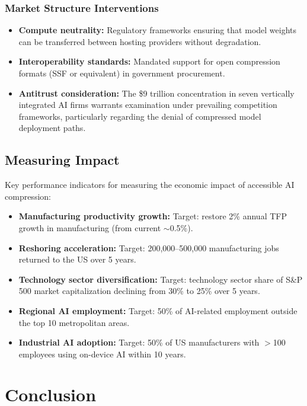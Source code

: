 \documentclass[11pt,a4paper,openright]{book}
\begin{document}
\subsection{Market Structure Interventions}

\begin{itemize}
	\item \textbf{Compute neutrality:} Regulatory frameworks ensuring that model weights can be transferred between hosting providers without degradation.
	\item \textbf{Interoperability standards:} Mandated support for open compression formats (SSF or equivalent) in government procurement.
	\item \textbf{Antitrust consideration:} The \$9 trillion concentration in seven vertically integrated AI firms warrants examination under prevailing competition frameworks, particularly regarding the denial of compressed model deployment paths.
\end{itemize}

\section{Measuring Impact}

Key performance indicators for measuring the economic impact of accessible AI compression:

\begin{itemize}
	\item \textbf{Manufacturing productivity growth:} Target: restore 2\% annual TFP growth in manufacturing (from current $\sim$0.5\%).
	\item \textbf{Reshoring acceleration:} Target: 200,000--500,000 manufacturing jobs returned to the US over 5 years.
	\item \textbf{Technology sector diversification:} Target: technology sector share of S\&P 500 market capitalization declining from 30\% to 25\% over 5 years.
	\item \textbf{Regional AI employment:} Target: 50\% of AI-related employment outside the top 10 metropolitan areas.
	\item \textbf{Industrial AI adoption:} Target: 50\% of US manufacturers with $>$100 employees using on-device AI within 10 years.
\end{itemize}

\chapter{Conclusion}
\label{ch:conclusion}
\end{document}
